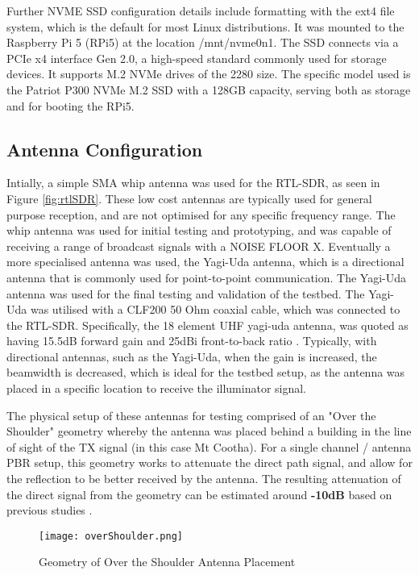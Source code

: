 Further NVME SSD configuration details include formatting with the ext4 file system, which is the default for most Linux distributions. It was mounted to the Raspberry Pi 5 (RPi5) at the location /mnt/nvme0n1. The SSD connects via a PCIe x4 interface Gen 2.0, a high-speed standard commonly used for storage devices. It supports M.2 NVMe drives of the 2280 size. The specific model used is the Patriot P300 NVMe M.2 SSD with a 128GB capacity, serving both as storage and for booting the RPi5.


\subsection{Antenna Configuration \label{sec:antenna}}
Intially, a simple SMA whip antenna was used for the RTL-SDR, as seen in Figure \ref{fig:rtlSDR}. These low cost antennas are typically used for general purpose reception, and are not optimised for any specific frequency range. The whip antenna was used for initial testing and prototyping, and was capable of receiving a range of broadcast signals with a NOISE FLOOR X. Eventually a more specialised antenna was used, the Yagi-Uda antenna, which is a directional antenna that is commonly used for point-to-point communication. The Yagi-Uda antenna was used for the final testing and validation of the testbed. The Yagi-Uda was utilised with a CLF200 50 Ohm coaxial cable, which was connected to the RTL-SDR. Specifically, the 18 element UHF yagi-uda antenna, was quoted as having 15.5dB forward gain and 25dBi front-to-back ratio \cite{AntennaPiece}. Typically, with directional antennas, such as the Yagi-Uda, when the gain is increased, the beamwidth is decreased, which is ideal for the testbed setup, as the antenna was placed in a specific location to receive the illuminator signal.

The physical setup of these antennas for testing comprised of an "Over the Shoulder" geometry whereby the antenna was placed behind a building in the line of sight of the TX signal (in this case Mt Cootha). For a single channel / antenna PBR setup, this geometry works to attenuate the direct path signal, and allow for the reflection to be better received by the antenna. The resulting attenuation of the direct signal from the geometry can be estimated around \textbf{ -10dB} based on previous studies \cite{GeometryAttenuation}.


\begin{figure}[htbp]
    \centering
    \texttt{[image: overShoulder.png]}
    \caption{Geometry of Over the Shoulder Antenna Placement}
    \label{fig:overTheShoulder}
\end{figure}



